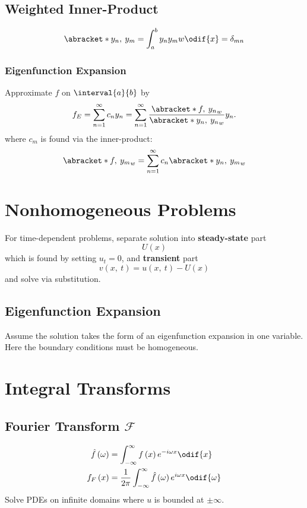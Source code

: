 \documentclass{article}
\begin{document}
\begin{multicols*}{3}
    \subsection{Weighted Inner-Product}
    \begin{equation*}
        \abracket*{y_n,\: y_m} = \int_a^b y_n y_m w \odif{x} = \delta_{mn}
    \end{equation*}
    \subsubsection{Eigenfunction Expansion}
    Approximate \(f\) on \(\interval{a}{b}\) by
    \begin{equation*}
        f_E = \sum_{n = 1}^\infty c_n y_n = \sum_{n = 1}^\infty \frac{\abracket*{f,\: y_n}_w}{\abracket*{y_n,\: y_n}_w} y_n.
    \end{equation*}
    where \(c_m\) is found via the inner-product:
    \begin{equation*}
        \abracket*{f,\: y_m}_w = \sum_{n = 1}^\infty c_n \abracket*{y_n,\: y_m}_w
    \end{equation*}
    \section{Nonhomogeneous Problems}
    For time-dependent problems, separate solution into \textbf{steady-state} part
    \begin{equation*}
        U\left( x \right)
    \end{equation*}
    which is found by setting \(u_t = 0\), and \textbf{transient} part
    \begin{equation*}
        v\left( x,\: t \right) = u\left( x, \: t \right) - U\left( x \right)
    \end{equation*}
    and solve via substitution.
    \subsection{Eigenfunction Expansion}
    Assume the solution takes the form of an eigenfunction expansion in
    one variable. Here the boundary conditions must be homogeneous.
    \section{Integral Transforms}
    \subsection{Fourier Transform \texorpdfstring{\(\mathscr{F}\)}{F}}
    \begin{align*}
        \hat{f}\left( \omega \right) & = \int_{-\infty}^\infty f\left( x \right) e^{-i \omega x} \odif{x}                               \\
        f_F\left( x \right)          & = \frac{1}{2\pi} \int_{-\infty}^\infty \hat{f}\left( \omega \right) e^{i \omega x} \odif{\omega}
    \end{align*}
    Solve PDEs on infinite domains where \(u\) is bounded at \(\pm \infty\).

\end{multicols*}
\end{document}
